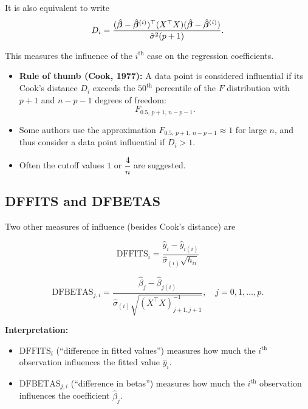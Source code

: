 It is also equivalent to write
\[
D_i =
\frac{(\hat{\boldsymbol{\beta}} - \hat{\boldsymbol{\beta}}^{(i)})^{\top}
(X^{\top}X)
(\hat{\boldsymbol{\beta}} - \hat{\boldsymbol{\beta}}^{(i)})}
{\hat{\sigma}^2 (p+1)}.
\]

This measures the influence of the $i^{\text{th}}$ case on the regression coefficients.

\begin{keyresult}
\begin{itemize}
\item \textbf{Rule of thumb (Cook, 1977):} A data point is considered influential if its Cook's distance $D_i$ exceeds the $50^{\text{th}}$ percentile of the $F$ distribution with $p+1$ and $n-p-1$ degrees of freedom:
\[
F_{0.5,\, p+1,\, n-p-1}.
\]

\item Some authors use the approximation $F_{0.5,\, p+1,\, n-p-1} \approx 1$ for large $n$, and thus consider a data point influential if $D_i > 1$.

\item Often the cutoff values $1$ or $\dfrac{4}{n}$ are suggested.
\end{itemize}
\end{keyresult}

\subsection{DFFITS and DFBETAS}

Two other measures of influence (besides Cook's distance) are

\[
\text{DFFITS}_i = \frac{\hat{y}_i - \hat{y}_{i(i)}}{\hat{\sigma}_{(i)} \sqrt{h_{ii}}}
\]

\[
\text{DFBETAS}_{j,i} =
\frac{\hat{\beta}_j - \hat{\beta}_{j(i)}}
{\hat{\sigma}_{(i)} \sqrt{(X^{\top}X)^{-1}_{j+1,j+1}}},
\quad j = 0,1,\dots,p.
\]

\begin{notebox}
\textbf{Interpretation:}
\begin{itemize}
\item $\text{DFFITS}_i$ (``difference in fitted values'') measures how much the $i^{\text{th}}$ observation influences the fitted value $\hat{y}_i$.

\item $\text{DFBETAS}_{j,i}$ (``difference in betas'') measures how much the $i^{\text{th}}$ observation influences the coefficient $\hat{\beta}_j$.
\end{itemize}
\end{notebox}


